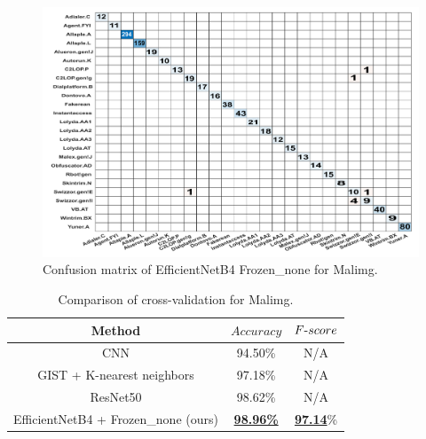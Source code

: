 \documentclass[conference]{IEEEtran}
\begin{document}
\begin{table}[t]
	\caption{Top five models for Malimg.}
	\label{tab_top5_malimg}
	\centering
\end{table}

\begin{figure}[t]
	\centering
	\includegraphics[width=\linewidth,clip]{Malimg_EfficientNetB4_none.pdf}
	\caption{Confusion matrix of EfficientNetB4 Frozen\_none for Malimg.}
	\label{fig_malimg_cm}
\end{figure}

\begin{table}[t]
	\caption{Comparison of cross-validation for Malimg.}
	\label{tab_comparison_malimg_cross}
	\centering
	\begin{tabular}{ccc}
		\toprule
		Method & $Accuracy$ & $F\mathchar`-score$\\
		\midrule
CNN \cite{8330042} & 94.50\% & N/A  \\
GIST + K-nearest neighbors  \cite{10.1145/2016904.2016908} & 97.18\% & N/A \\
ResNet50 \cite{8260773} & 98.62\% & N/A \\
EfficientNetB4 + Frozen\_none (ours)& \textbf{\underline{98.96\%}} & \textbf{\underline{97.14}}\% \\
		\bottomrule
	\end{tabular}
\end{table}
\end{document}

